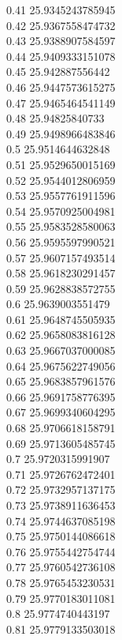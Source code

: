 {0.41	25.9345243785945\\
0.42	25.9367558474732\\
0.43	25.9388907584597\\
0.44	25.9409333151078\\
0.45	25.942887556442\\
0.46	25.9447573615275\\
0.47	25.9465464541149\\
0.48	25.94825840733\\
0.49	25.9498966483846\\
0.5	25.9514644632848\\
0.51	25.9529650015169\\
0.52	25.9544012806959\\
0.53	25.9557761911596\\
0.54	25.9570925004981\\
0.55	25.9583528580063\\
0.56	25.9595597990521\\
0.57	25.9607157493514\\
0.58	25.9618230291457\\
0.59	25.9628838572755\\
0.6	25.9639003551479\\
0.61	25.9648745505935\\
0.62	25.9658083816128\\
0.63	25.9667037000085\\
0.64	25.9675622749056\\
0.65	25.9683857961576\\
0.66	25.9691758776395\\
0.67	25.9699340604295\\
0.68	25.9706618158791\\
0.69	25.9713605485745\\
0.7	25.9720315991907\\
0.71	25.9726762472401\\
0.72	25.9732957137175\\
0.73	25.9738911636453\\
0.74	25.9744637085198\\
0.75	25.9750144086618\\
0.76	25.9755442754744\\
0.77	25.9760542736108\\
0.78	25.9765453230531\\
0.79	25.9770183011081\\
0.8	25.9774740443197\\
0.81	25.9779133503018\\
}
